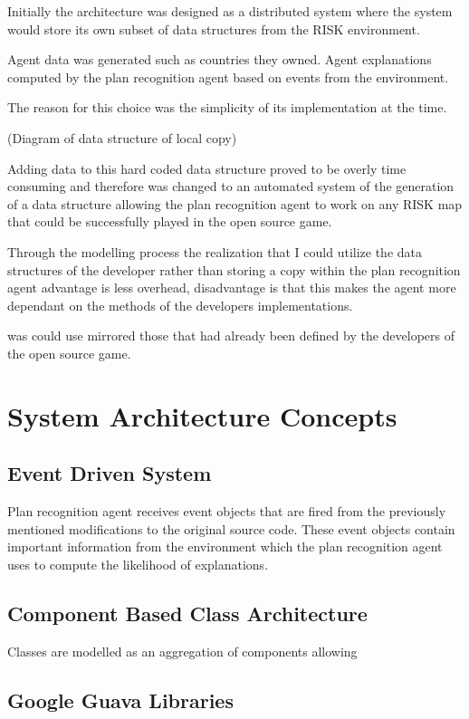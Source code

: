 \documentclass[parskip]{cs4rep}
\begin{document}
Initially the architecture was designed as a distributed system where the system would store its own subset of data structures from the RISK environment.

Agent data was generated such as countries they owned.
Agent explanations computed by the plan recognition agent based on events from the environment.

The reason for this choice was the simplicity of its implementation at the time.

(Diagram of data structure of local copy)

Adding data to this hard coded data structure proved to be overly time consuming and therefore was changed to an automated system of the generation of a data structure allowing the plan recognition agent to work on any RISK map that could be successfully played in the open source game.

Through the modelling process the realization that I could utilize the data structures of the developer rather than storing a copy within the plan recognition agent advantage is less overhead, disadvantage is that this makes the agent more dependant on the methods of the developers implementations.

 was could use mirrored those that had already been defined by the developers of the open source game.

\section{System Architecture Concepts}

\subsection{Event Driven System}

Plan recognition agent receives event objects that are fired from the previously mentioned modifications to the original source code. These event objects contain important information from the environment which the plan recognition agent uses to compute the likelihood of explanations.

\subsection{Component Based Class Architecture}

Classes are modelled as an aggregation of components allowing

\subsection{Google Guava Libraries}
\end{document}
